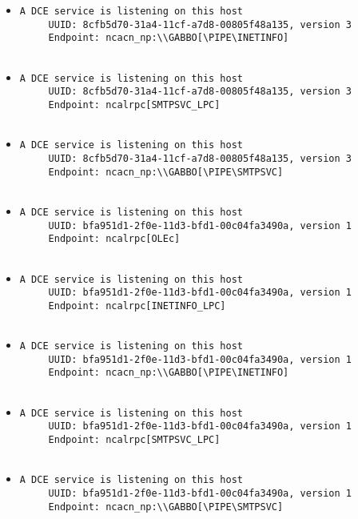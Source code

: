 \documentclass{article}
\begin{document}
\begin{itemize}
\begin{verbatim}
\end{verbatim}\item \begin{verbatim}
A DCE service is listening on this host
     UUID: 8cfb5d70-31a4-11cf-a7d8-00805f48a135, version 3
     Endpoint: ncacn_np:\\GABBO[\PIPE\INETINFO]


\end{verbatim}\item \begin{verbatim}
A DCE service is listening on this host
     UUID: 8cfb5d70-31a4-11cf-a7d8-00805f48a135, version 3
     Endpoint: ncalrpc[SMTPSVC_LPC]


\end{verbatim}\item \begin{verbatim}
A DCE service is listening on this host
     UUID: 8cfb5d70-31a4-11cf-a7d8-00805f48a135, version 3
     Endpoint: ncacn_np:\\GABBO[\PIPE\SMTPSVC]


\end{verbatim}\item \begin{verbatim}
A DCE service is listening on this host
     UUID: bfa951d1-2f0e-11d3-bfd1-00c04fa3490a, version 1
     Endpoint: ncalrpc[OLEc]


\end{verbatim}\item \begin{verbatim}
A DCE service is listening on this host
     UUID: bfa951d1-2f0e-11d3-bfd1-00c04fa3490a, version 1
     Endpoint: ncalrpc[INETINFO_LPC]


\end{verbatim}\item \begin{verbatim}
A DCE service is listening on this host
     UUID: bfa951d1-2f0e-11d3-bfd1-00c04fa3490a, version 1
     Endpoint: ncacn_np:\\GABBO[\PIPE\INETINFO]


\end{verbatim}\item \begin{verbatim}
A DCE service is listening on this host
     UUID: bfa951d1-2f0e-11d3-bfd1-00c04fa3490a, version 1
     Endpoint: ncalrpc[SMTPSVC_LPC]


\end{verbatim}\item \begin{verbatim}
A DCE service is listening on this host
     UUID: bfa951d1-2f0e-11d3-bfd1-00c04fa3490a, version 1
     Endpoint: ncacn_np:\\GABBO[\PIPE\SMTPSVC]



\end{verbatim}
\end{itemize}
\end{document}
